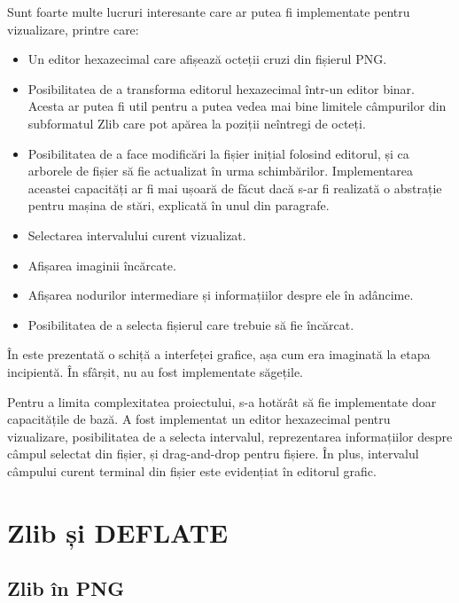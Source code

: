 \documentclass[a4paper,12pt]{report}
\begin{document}
Sunt foarte multe lucruri interesante care ar putea fi implementate pentru vizualizare, printre care:
\begin{itemize}
    \item
        Un editor hexazecimal care afișează octeții cruzi din fișierul \ac{PNG}. 
    \item
        Posibilitatea de a transforma editorul hexazecimal într-un editor binar.
        Acesta ar putea fi util pentru a putea vedea mai bine limitele câmpurilor din
        subformatul Zlib care pot apărea la poziții neîntregi de octeți.
    \item
        Posibilitatea de a face modificări la fișier inițial folosind editorul,
        și ca arborele de fișier să fie actualizat în urma schimbărilor.
        Implementarea aceastei capacități ar fi mai ușoară de făcut dacă s-ar fi realizată
        o abstrație pentru mașina de stări, explicată în unul din paragrafe.
    \item
        Selectarea intervalului curent vizualizat.
    \item
        Afișarea imaginii încărcate.
    \item
        Afișarea nodurilor intermediare și informațiilor despre ele în adâncime.
    \item
        Posibilitatea de a selecta fișierul care trebuie să fie încărcat.
\end{itemize}

În  este prezentată o schiță a interfeței grafice,
așa cum era imaginată la etapa incipientă.
În sfârșit, nu au fost implementate săgețile.


Pentru a limita complexitatea proiectului, s-a hotărât să fie implementate doar capacitățile de bază.
A fost implementat un editor hexazecimal pentru vizualizare, posibilitatea de a selecta intervalul,
reprezentarea informațiilor despre câmpul selectat din fișier, și drag-and-drop pentru fișiere.
În plus, intervalul câmpului curent terminal din fișier este evidențiat în editorul grafic.

\section{Zlib și DEFLATE}

\subsection{Zlib în \ac{PNG}}
\end{document}
